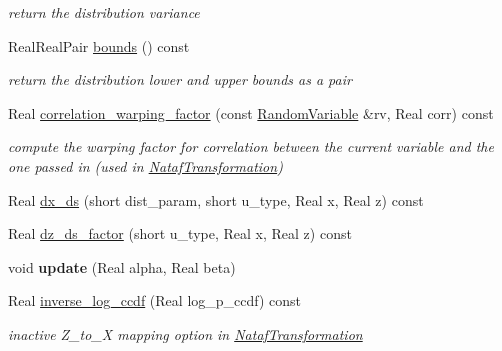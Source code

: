 \begin{DoxyCompactItemize}
\begin{DoxyCompactList}\small\item\em return the distribution variance \end{DoxyCompactList}\item 
Real\+Real\+Pair \hyperlink{classPecos_1_1WeibullRandomVariable_a4bdb95a8fa5fffaa0de5102f56963cf2}{bounds} () const \label{classPecos_1_1WeibullRandomVariable_a4bdb95a8fa5fffaa0de5102f56963cf2}

\begin{DoxyCompactList}\small\item\em return the distribution lower and upper bounds as a pair \end{DoxyCompactList}\item 
Real \hyperlink{classPecos_1_1WeibullRandomVariable_a9ee48b3ca93459136b2e73f77873c4aa}{correlation\+\_\+warping\+\_\+factor} (const \hyperlink{classPecos_1_1RandomVariable}{Random\+Variable} \&rv, Real corr) const \label{classPecos_1_1WeibullRandomVariable_a9ee48b3ca93459136b2e73f77873c4aa}

\begin{DoxyCompactList}\small\item\em compute the warping factor for correlation between the current variable and the one passed in (used in \hyperlink{classPecos_1_1NatafTransformation}{Nataf\+Transformation}) \end{DoxyCompactList}\item 
Real \hyperlink{classPecos_1_1WeibullRandomVariable_af889af8adfb262c9b74f573b2a9ffc99}{dx\+\_\+ds} (short dist\+\_\+param, short u\+\_\+type, Real x, Real z) const 
\item 
Real \hyperlink{classPecos_1_1WeibullRandomVariable_af6b5fc528523180bed5fc3008dcea205}{dz\+\_\+ds\+\_\+factor} (short u\+\_\+type, Real x, Real z) const 
\item 
void {\bfseries update} (Real alpha, Real beta)\label{classPecos_1_1WeibullRandomVariable_aaa82eccfdca4d440a4e2d4a890b0d9ed}

\item 
Real \hyperlink{classPecos_1_1WeibullRandomVariable_aa8fe85dfcb1b7cb4357e6d4ec32601b9}{inverse\+\_\+log\+\_\+ccdf} (Real log\+\_\+p\+\_\+ccdf) const \label{classPecos_1_1WeibullRandomVariable_aa8fe85dfcb1b7cb4357e6d4ec32601b9}

\begin{DoxyCompactList}\small\item\em inactive Z\+\_\+to\+\_\+X mapping option in \hyperlink{classPecos_1_1NatafTransformation}{Nataf\+Transformation} \end{DoxyCompactList}\end{DoxyCompactItemize}
